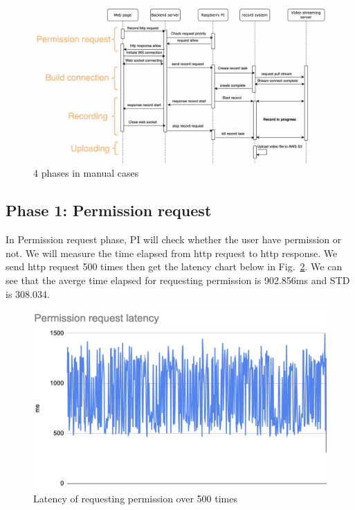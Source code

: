 \begin{figure}[H]
    \centering
    \includegraphics[width=\textwidth]{figsrc/result-4phases.png}
    \caption{4 phases in manual cases\label{fig:result-4phases}}
\end{figure}

\subsection{Phase 1: Permission request}
In Permission request phase, PI will check whether the user have permission or not. We will measure the time elapsed from http request to http response. We send http request 500 times then get the latency chart below in Fig.~\ref{fig:result-p1}. We can see that the averge time elapsed for requesting permission is 902.856ms and STD is 308.034.

\begin{figure}[H]
    \centering
    \includegraphics[width=\textwidth]{figsrc/result-p1.png}
    \caption{Latency of requesting permission over 500 times\label{fig:result-p1}}
\end{figure}

